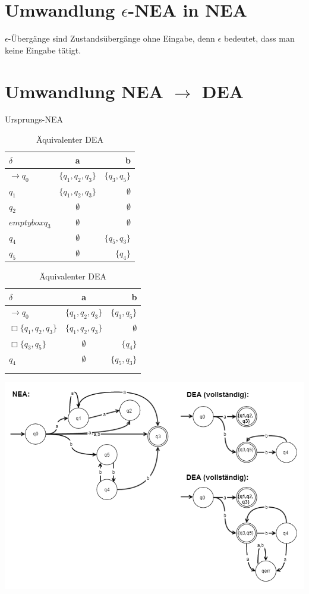 \section{Umwandlung $\epsilon$-NEA in NEA}

$\epsilon$-Übergänge sind Zustandsübergänge ohne Eingabe, denn $\epsilon$ bedeutet, dass man keine Eingabe tätigt.

\section{Umwandlung NEA $\rightarrow$ DEA}

\begin{table}[!htb]    
    \begin{minipage}{.5\linewidth}
      \caption{Ursprungs-NEA}
      \centering
      \begin{tabular}{ l | c r }
		  $\delta$ 		& a 	& b \\
		  \hline
		  $\rightarrow q_0$ 	& $\{q_1,q_2,q_3\}$ & $\{q_3,q_5\}$ \\
		  $q_1$					& $\{q_1,q_2,q_3\}$	& $\emptyset$ \\
		  $q_2$					& $\emptyset$		& $\emptyset$ \\
		  $emptybox q_3$		& $\emptyset$		& $\emptyset$ \\
		  $q_4$					& $\emptyset$		& $\{q_5,q_3\}$ \\
		  $q_5$					& $\emptyset$		& $\{q_4\}$
		\end{tabular}
    \end{minipage}%
    \begin{minipage}{.5\linewidth}
      \centering
        \caption{Äquivalenter DEA}
        \begin{tabular}{ l | c r }
		  $\delta$ 		& a 	& b \\
		  \hline
		  $\rightarrow q_0$ 	& $\{q_1,q_2,q_3\}$ & $\{q_3,q_5\}$ \\
		  $\Box \{q_1,q_2,q_3\}$		& $\{q_1,q_2,q_3\}$	& $\emptyset$ \\
		  $\Box \{q_3,q_5\}$	& $\emptyset$		& $\{q_4\}$ \\
		  $q_4$					& $\emptyset$		& $\{q_5,q_3\}$ \\	
		  						&					& \\
		  						&					& \\
		\end{tabular}
    \end{minipage} 
\end{table}

\includegraphics[width=\textwidth]{nea2dea}